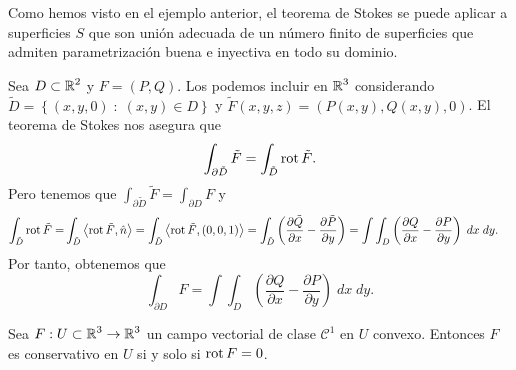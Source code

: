\begin{observation}
Como hemos visto en el ejemplo anterior, el teorema de Stokes se puede aplicar a superficies $\displaystyle S $ que son unión adecuada de un número finito de superficies que admiten parametrización buena e inyectiva en todo su dominio.
\end{observation}
\begin{observation}
	Sea $\displaystyle D \subset \mathbb{R}^{2} $ y $\displaystyle F = \left(P,Q\right) $. Los podemos incluir en $\displaystyle \mathbb{R}^{3} $ considerando $\displaystyle \tilde{D}= \left\{ \left(x,y,0\right) \; : \; \left(x,y\right)\in D\right\}  $ y $\displaystyle \tilde{F}\left(x,y,z\right)=\left(P\left(x,y\right), Q\left(x,y\right), 0\right) $. El teorema de Stokes nos asegura que
	\[\int _{\partial \tilde{D}}\tilde{F} =\int _{\tilde{D}}\operatorname{rot} \tilde{F}  .\]
	Pero tenemos que $\displaystyle \int _{\partial \tilde{D}}\tilde{F} =\int _{\partial D}F  $ y 
	\[
	\begin{split}
		\int _{\tilde{D}}\operatorname{rot} \tilde{F} = & \int _{\tilde{D}}\left\langle \operatorname{rot} \tilde{F}, \hat{n} \right\rangle  =\int _{\tilde{D}}\left\langle \operatorname{rot} \tilde{F}, \left(0,0,1\right) \right\rangle 
		=  \int _{\tilde{D}}\left(\frac{\partial \tilde{Q}}{\partial x}-\frac{\partial \tilde{P}}{\partial y}\right) =\int \int _{D}\left(\frac{\partial Q}{\partial x}-\frac{\partial P}{\partial y}\right) \; dx \; dy.
	\end{split}
	\]
Por tanto, obtenemos que 
\[\int _{\partial D}F =\int \int _{D}\left(\frac{\partial Q}{\partial x}-\frac{\partial P}{\partial y}\right) \; dx \; dy .\]
\end{observation}
\begin{prop}
Sea $\displaystyle F : U\subset \mathbb{R}^{3} \to \mathbb{R}^{3} $ un campo vectorial de clase $\displaystyle \mathcal{C}^{1} $ en $\displaystyle U $ convexo. Entonces $\displaystyle F $ es conservativo en $\displaystyle U $ si y solo si $\displaystyle \operatorname{rot} F = 0 $. 
\end{prop}
